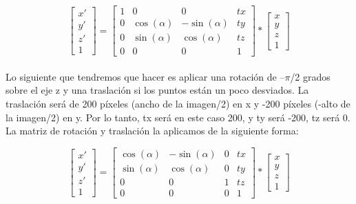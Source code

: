 \begin{equation}
\label{ec.matriz}
\left[\begin{array}{cc}
x' \\ 
y' \\
z' \\
1
\end{array}\right] = \left[\begin{array}{cccc}
1 & 0 & 0 & tx \\ 
0 & \cos(\alpha) & -\sin(\alpha) & ty\\
0 & \sin(\alpha) & \cos(\alpha) & tz \\
0 & 0 & 0 & 1
\end{array}\right]* \left[\begin{array}{cc}
x \\ 
y \\
z \\
1
\end{array}\right]
\end{equation}
\\

Lo siguiente que tendremos que hacer es aplicar una rotación de –\(\pi\)/2 grados sobre el eje z y una traslación si los puntos están un poco desviados. La traslación será de 200 píxeles (ancho de la imagen/2) en x y -200 píxeles (-alto de la imagen/2) en y. Por lo tanto, tx será en este caso 200, y ty será -200, tz será 0. La matriz de rotación y traslación la aplicamos de la siguiente forma:

\begin{equation}
\left[\begin{array}{cc}
x' \\ 
y' \\
z' \\
1
\end{array}\right] = \left[\begin{array}{cccc}
\cos(\alpha) & -\sin(\alpha) & 0 & tx \\ 
\sin(\alpha) & \cos(\alpha) & 0 & ty\\
0 & 0 & 1 & tz \\
0 & 0 & 0 & 1
\end{array}\right]* \left[\begin{array}{cc}
x \\ 
y \\
z \\
1
\end{array}\right]
\end{equation}
\\

